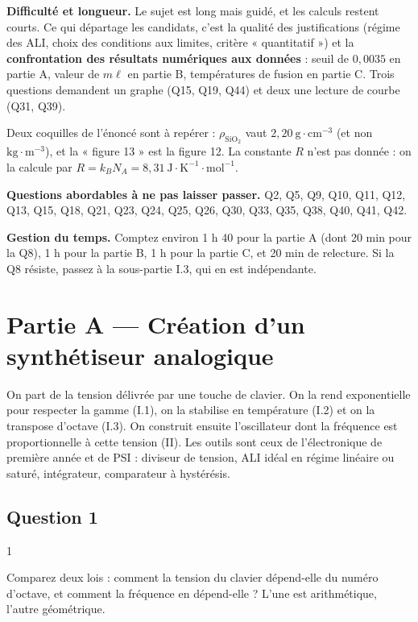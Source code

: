 \documentclass[11pt,a4paper]{article}
\begin{document}
\textbf{Difficulté et longueur.} Le sujet est long mais guidé, et les calculs restent courts. Ce qui départage les candidats, c'est la qualité des justifications (régime des ALI, choix des conditions aux limites, critère « quantitatif ») et la \textbf{confrontation des résultats numériques aux données} : seuil de \(0{,}0035\) en partie A, valeur de \(m\ell\) en partie B, températures de fusion en partie C. Trois questions demandent un graphe (Q15, Q19, Q44) et deux une lecture de courbe (Q31, Q39).

Deux coquilles de l'énoncé sont à repérer : \(\rho_{\mathrm{SiO_2}}\) vaut \(2{,}20\ \mathrm{g\cdot cm^{-3}}\) (et non \(\mathrm{kg\cdot m^{-3}}\)), et la « figure 13 » est la figure 12. La constante \(R\) n'est pas donnée : on la calcule par \(R=k_BN_A=8{,}31\ \mathrm{J\cdot K^{-1}\cdot mol^{-1}}\).

\textbf{Questions abordables à ne pas laisser passer.} Q2, Q5, Q9, Q10, Q11, Q12, Q13, Q15, Q18, Q21, Q23, Q24, Q25, Q26, Q30, Q33, Q35, Q38, Q40, Q41, Q42.

\textbf{Gestion du temps.} Comptez environ 1 h 40 pour la partie A (dont 20 min pour la Q8), 1 h pour la partie B, 1 h pour la partie C, et 20 min de relecture. Si la Q8 résiste, passez à la sous-partie I.3, qui en est indépendante.

\hypertarget{partie-a-cruxe9ation-dun-synthuxe9tiseur-analogique}{%
\section{Partie A --- Création d'un synthétiseur analogique}\label{partie-a-cruxe9ation-dun-synthuxe9tiseur-analogique}}

On part de la tension délivrée par une touche de clavier. On la rend exponentielle pour respecter la gamme (I.1), on la stabilise en température (I.2) et on la transpose d'octave (I.3). On construit ensuite l'oscillateur dont la fréquence est proportionnelle à cette tension (II). Les outils sont ceux de l'électronique de première année et de PSI : diviseur de tension, ALI idéal en régime linéaire ou saturé, intégrateur, comparateur à hystérésis.

\hypertarget{question-1}{%
\subsection{Question 1}\label{question-1}}

\begin{indication}{1}

Comparez deux lois : comment la tension du clavier dépend-elle du numéro d'octave, et comment la fréquence en dépend-elle ? L'une est arithmétique, l'autre géométrique.

\end{indication}
\end{document}
